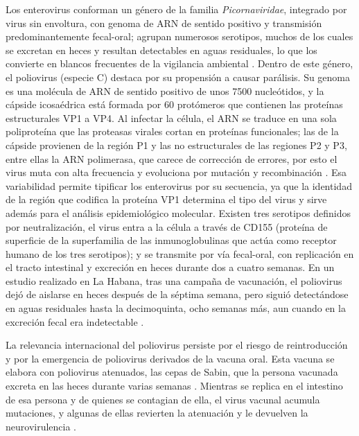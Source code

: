 Los enterovirus conforman un género de la familia \textit{Picornaviridae}, integrado por virus sin envoltura, con genoma de ARN de sentido positivo y transmisión predominantemente fecal-oral; agrupan numerosos serotipos, muchos de los cuales se excretan en heces y resultan detectables en aguas residuales, lo que los convierte en blancos frecuentes de la vigilancia ambiental \cite{Kissova_2022}. Dentro de este género, el poliovirus (especie C) destaca por su propensión a causar parálisis. Su genoma es una molécula de ARN de sentido positivo de unos 7500 nucleótidos, y la cápside icosaédrica está formada por 60 protómeros que contienen las proteínas estructurales VP1 a VP4. Al infectar la célula, el ARN se traduce en una sola poliproteína que las proteasas virales cortan en proteínas funcionales; las de la cápside provienen de la región P1 y las no estructurales de las regiones P2 y P3, entre ellas la ARN polimerasa, que carece de corrección de errores, por esto el virus muta con alta frecuencia y evoluciona por mutación y recombinación \cite{Zurbriggen_2008}. Esa variabilidad permite tipificar los enterovirus por su secuencia, ya que la identidad de la región que codifica la proteína VP1 determina el tipo del virus y sirve además para el análisis epidemiológico molecular. Existen tres serotipos definidos por neutralización, el virus entra a la célula a través de CD155 (proteína de superficie de la superfamilia de las inmunoglobulinas que actúa como receptor humano de los tres serotipos); y se transmite por vía fecal-oral, con replicación en el tracto intestinal y excreción en heces durante dos a cuatro semanas. En un estudio realizado en La Habana, tras una campaña de vacunación, el poliovirus dejó de aislarse en heces después de la séptima semana, pero siguió detectándose en aguas residuales hasta la decimoquinta, ocho semanas más, aun cuando en la excreción fecal era indetectable \cite{MasLago_2003,Martin_2016}.

La relevancia internacional del poliovirus persiste por el riesgo de reintroducción y por la emergencia de poliovirus derivados de la vacuna oral. Esta vacuna se elabora con poliovirus atenuados, las cepas de Sabin, que la persona vacunada excreta en las heces durante varias semanas \cite{Martin_2016}. Mientras se replica en el intestino de esa persona y de quienes se contagian de ella, el virus vacunal acumula mutaciones, y algunas de ellas revierten la atenuación y le devuelven la neurovirulencia \cite{Zurbriggen_2008}.


